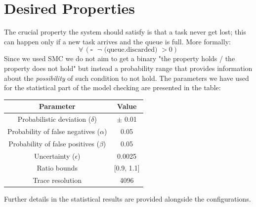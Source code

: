 \documentclass{article}
\begin{document}
	\section{Desired Properties}
		The crucial property the system should satisfy is that a task never get lost; this can happen only if a new task arrives and the queue is full. More formally:
		\begin{equation}
			\forall\, (\square \text{ $\neg$ (queue.discarded) } > 0)
		\end{equation}
		Since we used SMC we do not aim to get a binary "the property holds / the property does not hold" but instead a probability range that provides information about the \emph{possibility} of such condition to not hold. The parameters we have used for the statistical part of the model checking are presented in the table:
		\begin{center}
			\begin{tabular}{ | c | c |}
				\hline
				Parameter & Value \\
				\hline
				\hline
				Probabilistic deviation ($\delta$) & $\pm$ 0.01 \\
				\hline
				Probability of false negatives ($\alpha$) & 0.05 \\
				\hline
				Probability of false positives ($\beta$) & 0.05 \\
				\hline
				Uncertainty ($\epsilon$) & 0.0025 \\
				\hline
				Ratio bounds & [0.9, 1.1]\\
				\hline
				Trace resolution & 4096 \\
				\hline
			\end{tabular}
		\end{center}
		Further details in the statistical results are provided alongside the configurations.
\end{document}
